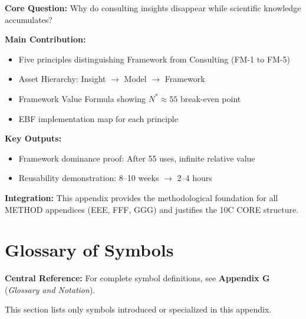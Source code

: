 \begin{tcolorbox}[colback=green!10!white, colframe=green!75!black,
    title=\textbf{Appendix FM: Summary}]

\textbf{Core Question:} Why do consulting insights disappear while scientific knowledge accumulates?

\textbf{Main Contribution:}
\begin{itemize}[nosep]
    \item Five principles distinguishing Framework from Consulting (FM-1 to FM-5)
    \item Asset Hierarchy: Insight $\to$ Model $\to$ Framework
    \item Framework Value Formula showing $N^* \approx 55$ break-even point
    \item EBF implementation map for each principle
\end{itemize}

\textbf{Key Outputs:}
\begin{itemize}[nosep]
    \item Framework dominance proof: After 55 uses, infinite relative value
    \item Reusability demonstration: 8--10 weeks $\to$ 2--4 hours
\end{itemize}

\textbf{Integration:} This appendix provides the methodological foundation for all METHOD appendices (EEE, FFF, GGG) and justifies the 10C CORE structure.

\end{tcolorbox}


\section{Glossary of Symbols}
\label{sec:fm-glossary}

\begin{tcolorbox}[colback=blue!5!white, colframe=blue!75!black]
\textbf{Central Reference:} For complete symbol definitions, see
\textbf{Appendix G} (\textit{Glossary and Notation}).

This section lists only symbols introduced or specialized in this appendix.
\end{tcolorbox}

\vspace{0.5em}

